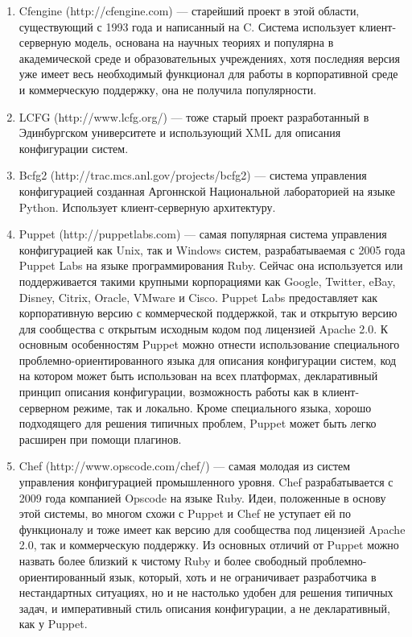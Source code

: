 \begin{enumerate}
\item Cfengine (http://cfengine.com) — старейший проект в этой области, существующий с 1993 года и написанный на C. Система использует клиент-серверную модель, основана на научных теориях и популярна в академической среде и образовательных учреждениях, хотя последняя версия уже имеет весь необходимый функционал для работы в корпоративной среде и коммерческую поддержку, она не получила популярности.
\item LCFG (http://www.lcfg.org/) — тоже старый проект разработанный в Эдинбургском университете и использующий XML для описания конфигурации систем.
\item Bcfg2 (http://trac.mcs.anl.gov/projects/bcfg2) — система управления конфигурацией созданная Аргоннской Национальной лабораторией на языке Python. Использует клиент-серверную архитектуру.
\item Puppet (http://puppetlabs.com) — самая популярная система управления конфигурацией как Unix, так и Windows систем, разрабатываемая с 2005 года Puppet Labs на языке программирования Ruby. Сейчас она используется или поддерживается такими крупными корпорациями как Google, Twitter, eBay, Disney, Citrix, Oracle, VMware и Cisco.  Puppet Labs предоставляет как корпоративную версию с коммерческой поддержкой, так и открытую версию для сообщества с открытым исходным кодом под лицензией Apache 2.0. К основным особенностям Puppet можно отнести использование специального проблемно-ориентированного языка для описания конфигурации систем, код на котором может быть использован на всех платформах, декларативный принцип описания конфигурации, возможность работы как в клиент-серверном режиме, так и локально. Кроме специального языка, хорошо подходящего для решения типичных проблем, Puppet может быть легко расширен при помощи плагинов.
\item Chef (http://www.opscode.com/chef/) — самая молодая из систем управления конфигурацией промышленного уровня. Chef разрабатывается с 2009 года компанией Opscode на языке Ruby. Идеи, положенные в основу этой системы, во многом схожи с Puppet и Chef не уступает ей по функционалу и тоже имеет как версию для сообщества под лицензией Apache 2.0, так и коммерческую поддержку. Из основных отличий от Puppet можно назвать более близкий к чистому Ruby и более свободный проблемно-ориентированный язык, который, хоть и не ограничивает разработчика в нестандартных ситуациях, но и не настолько удобен для решения типичных задач, и императивный стиль описания конфигурации, а не декларативный, как у Puppet.
\end{enumerate}


